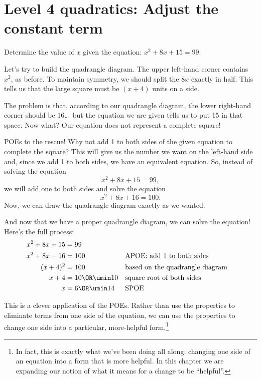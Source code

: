 \section{Level 4 quadratics: Adjust the constant term}

\begin{boxedexplore}
Determine the value of $x$ given the equation: $x^2 + 8x + 15 = 99$.
\end{boxedexplore} %

Let's try to build the quadrangle diagram. The upper left-hand corner contains $x^2$, as before. To maintain symmetry, we should split the $8x$ exactly in half. This tells us that the large square must be $(x+4)$ units on a side.


The problem is that, according to our quadrangle diagram, the lower right-hand corner should be 16\ldots\ but the equation we are given tells us to put 15 in that space. Now what? Our equation does not represent a complete square!


POEs to the rescue! Why not add 1 to both sides of the given equation to complete the square? This will give us the number we want on the left-hand side and, since we add 1 to both sides, we have an equivalent equation. So, instead of solving the equation
\[x^2 + 8x + 15 = 99,\]
we will add one to both sides and solve the equation
\[x^2 + 8x + 16 = 100.\]
Now, we can draw the quadrangle diagram exactly as we wanted.


And now that we have a proper quadrangle diagram, we can solve the equation! Here's the full process:
\begin{align*}
x^2 + 8x + 15 &= 99
\\
x^2 + 8x + 16 &= 100
&&\text{APOE: add 1 to both sides}
\\
(x+4)^2 &= 100
&&\text{based on the quadrangle diagram}
\\
x+4 &= 10 \OR \umin10
&&\text{square root of both sides}
\\
x &= 6 \OR \umin14
&&\text{SPOE}
\end{align*}

This is a clever application of the POEs. Rather than use the properties to eliminate terms from one side of the equation, we can use the properties to change one side into a particular, more-helpful form.\footnote{In fact, this is exactly what we've been doing all along: changing one side of an equation into a form that is more helpful. In this chapter we are expanding our notion of what it means for a change to be ``helpful''.}

